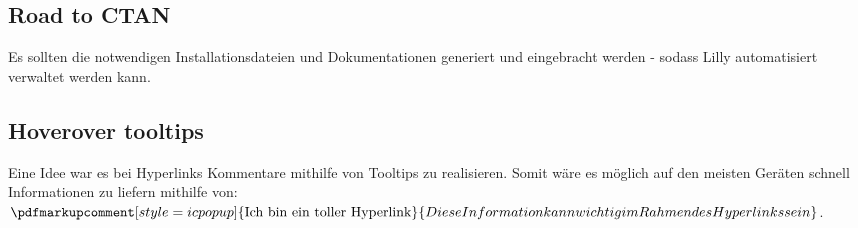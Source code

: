 \subsection{Road to CTAN}
Es sollten die notwendigen Installationsdateien und Dokumentationen generiert und eingebracht werden - sodass Lilly automatisiert verwaltet werden kann.

\subsection{Hoverover tooltips}

Eine Idee war es bei Hyperlinks Kommentare mithilfe von Tooltips zu realisieren. Somit wäre es möglich auf den meisten Geräten schnell Informationen zu liefern mithilfe von: $\pdfmarkupcomment[style=icpopup]{\text{Ich bin ein toller Hyperlink}}{Diese Information kann wichtig im Rahmen des Hyperlinks sein}$.

